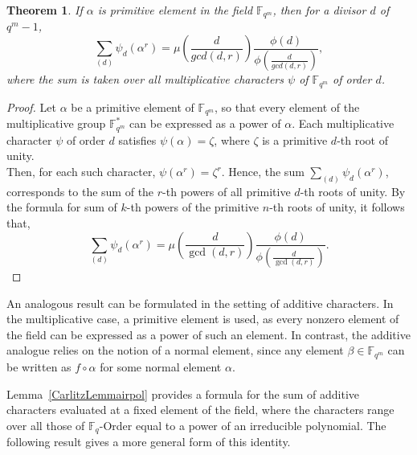 \documentclass[12pt,a4paper]{article}
\theoremstyle{plain}
\newtheorem{thm}{Theorem}[section]
\theoremstyle{definition}
\numberwithin{equation}{section}
\begin{document}
    \begin{thm}
        If $\alpha$ is primitive element in the field $\mathbb{F}_{q^m}$, then for a divisor $d$ of $q^m-1$, $$\displaystyle \sum_{(d)} \psi_d(\alpha^r) = \mu \left( \dfrac{d}{gcd(d,r)} \right) \dfrac{\phi(d)}{\phi\left( \frac{d}{gcd(d,r)} \right)},$$ where the sum is taken over all multiplicative characters $\psi$ of $\mathbb{F}_{q^m}$ of order $d$.
    \end{thm}
    \begin{proof}
        Let $\alpha$ be a primitive element of $\mathbb{F}_{q^m}$, so that every element of the multiplicative group $\mathbb{F}_{q^m}^*$ can be expressed as a power of $\alpha$. Each multiplicative character $\psi$ of order $d$ satisfies $\psi(\alpha) = \zeta$, where $\zeta$ is a primitive $d$-th root of unity.\\
        Then, for each such character, $\psi(\alpha^r) = \zeta^r$. Hence, the sum  $\displaystyle \sum_{(d)} \psi_d(\alpha^r)$, corresponds to the sum of the $r$-th powers of all primitive $d$-th roots of unity.
        By the formula for sum of $k$-th powers of the primitive $n$-th roots of unity, it follows that, 
         \[\sum_{(d)} \psi_d(\alpha^r) = \mu\left( \frac{d}{\gcd(d, r)} \right) \frac{\phi(d)}{\phi\left( \frac{d}{\gcd(d, r)} \right)}.\]
    \end{proof}

    An analogous result can be formulated in the setting of additive characters. In the multiplicative case, a primitive element is used, as every nonzero element of the field can be expressed as a power of such an element. In contrast, the additive analogue relies on the notion of a normal element, since any element $\beta \in \mathbb{F}_{q^m}$ can be written as $f \circ \alpha$ for some normal element $\alpha$.

    Lemma~\ref{CarlitzLemmairpol} provides a formula for the sum of additive characters evaluated at a fixed element of the field, where the characters range over all those of $\mathbb{F}_q$-Order equal to a power of an irreducible polynomial. The following result gives a more general form of this identity.
\end{document}
